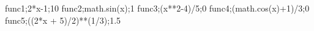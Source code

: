 func1;2*x-1;10
func2;math.sin(x);1
func3;(x**2-4)/5;0
func4;(math.cos(x)+1)/3;0
func5;((2*x + 5)/2)**(1/3);1.5